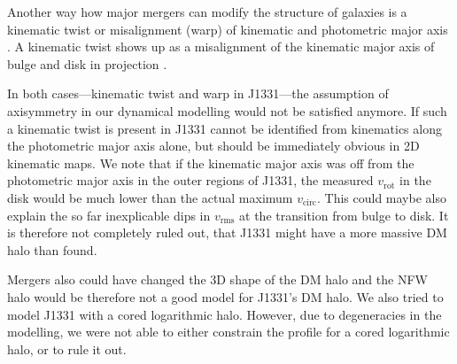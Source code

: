 Another way how major mergers can modify the structure of galaxies is a kinematic twist \Wilma{[TO DO: REF]} or misalignment (warp) of kinematic and photometric major axis \Wilma{[TO DO: REF]}. A kinematic twist shows up as a misalignment of the kinematic major axis of bulge and disk in projection . 

In both cases---kinematic twist and warp in J1331---the assumption of axisymmetry in our dynamical modelling would not be satisfied anymore. If such a kinematic twist is present in J1331 cannot be identified from kinematics along the photometric major axis alone, but should be immediately obvious in 2D kinematic maps. We note that if the kinematic major axis was off from the photometric major axis in the outer regions of J1331, the measured $v_\text{rot}$ in the disk  would be much lower than the actual maximum $v_\text{circ}$. This could maybe also explain the so far inexplicable dips in $v_\text{rms}$ at the transition from bulge to disk. It is therefore not completely ruled out, that J1331 might have a more massive DM halo than \citet{SWELLSV} found.

Mergers also could have changed the 3D shape of the DM halo and the NFW halo would be therefore not a good model for J1331's DM halo. We also tried to model J1331 with a cored logarithmic halo. However, due to degeneracies in the modelling, we were not able to either constrain the profile for a cored logarithmic halo, or to rule it out. 



